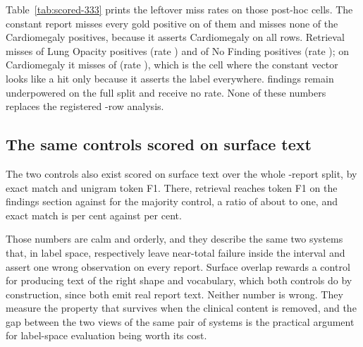 Table~\ref{tab:scored-333} prints the leftover miss rates on those
\FullSplitScorable{} post-hoc cells. The constant report misses every gold
positive on \FullSplitMajMissAll{} of them and misses none of the
\FullSplitMajCardioHit{} Cardiomegaly positives, because it asserts
Cardiomegaly on all \FullSplitMajCardioPred{} rows. Retrieval misses
\FullSplitRetLungOpMiss{} of \SkewSplitPresent{} Lung Opacity positives
(rate \FullSplitRetLungOpMissRate{}) and \FullSplitRetNoFindMiss{} of
\ScoredTwoSplit{} No Finding positives (rate \FullSplitRetNoFindMissRate{});
on Cardiomegaly it misses \FullSplitRetCardioMiss{} of
\FullSplitMajCardioHit{} (rate \FullSplitRetCardioMissRate{}), which is the
cell where the constant vector looks like a hit only because it asserts the
label everywhere. \NFullSplitUnderpowered{} findings remain underpowered on
the full split and receive no rate. None of these numbers replaces the
registered \NCohort{}-row analysis.

\begin{table}[tbp]
\centering
\caption{Post-hoc scoring of the same two controls on the frozen
\FullSplitN{}-report test split, after the registered \NCohort{}-report
analysis was frozen. \FullSplitScorable{} findings clear the presence gate of
\MinPresent{} gold positives; \NFullSplitUnderpowered{} remain underpowered
and receive no rate. Intervals are the two-sided \(95\%\) Clopper--Pearson
limits stored on the bound full-split table. The constant majority report
misses every gold positive except Cardiomegaly, which it asserts on every
row. This table does not replace the registered \NCohort{}-report analysis.}
\label{tab:scored-333}
\small

\end{table}

\subsection{The same controls scored on surface text}

The two controls also exist scored on surface text over the whole
\NTest{}-report split, by exact match and unigram token F1. There, retrieval
reaches \SurfaceRetrievalF{} token F1 on the findings section against
\SurfaceMajorityF{} for the majority control, a ratio of about \SurfaceRatio{}
to one, and exact match is \SurfaceRetrievalExact{} per cent against
\SurfaceMajorityExact{} per cent.

Those numbers are calm and orderly, and they describe the same two systems
that, in label space, respectively leave near-total failure inside the interval
and assert one wrong observation on every report. Surface overlap rewards a
control for producing text of the right shape and vocabulary, which both
controls do by construction, since both emit real report text. Neither number
is wrong. They measure the property that survives when the clinical content is
removed, and the gap between the two views of the same pair of systems is the
practical argument for label-space evaluation being worth its cost.

